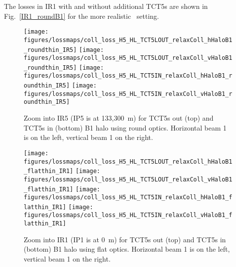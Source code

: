 The losses in IR1 with and without additional TCT5s are shown in Fig.~\ref{IR1_roundB1} for the more realistic \twosigmaret~setting. 

\begin{figure}
\begin{center}
\vskip-12mm
\texttt{[image: figures/lossmaps/coll\_loss\_H5\_HL\_TCT5LOUT\_relaxColl\_hHaloB1\_roundthin\_IR5]}
\texttt{[image: figures/lossmaps/coll\_loss\_H5\_HL\_TCT5LOUT\_relaxColl\_vHaloB1\_roundthin\_IR5]}
\texttt{[image: figures/lossmaps/coll\_loss\_H5\_HL\_TCT5IN\_relaxColl\_hHaloB1\_roundthin\_IR5]}
\texttt{[image: figures/lossmaps/coll\_loss\_H5\_HL\_TCT5IN\_relaxColl\_vHaloB1\_roundthin\_IR5]}
\end{center}
\vspace{-0.3cm}
 \caption{Zoom into IR5 (IP5 is at 133,300~m) for TCT5s out (top) and TCT5s in (bottom) B1 halo using round optics. Horizontal beam 1 is on the left, vertical beam 1 on the right.
  \label{IR5_roundB1}}
\end{figure}

\begin{figure}
\begin{center}
\vskip-12mm
\texttt{[image: figures/lossmaps/coll\_loss\_H5\_HL\_TCT5LOUT\_relaxColl\_hHaloB1\_flatthin\_IR1]}
\texttt{[image: figures/lossmaps/coll\_loss\_H5\_HL\_TCT5LOUT\_relaxColl\_vHaloB1\_flatthin\_IR1]}
\texttt{[image: figures/lossmaps/coll\_loss\_H5\_HL\_TCT5IN\_relaxColl\_hHaloB1\_flatthin\_IR1]}
\texttt{[image: figures/lossmaps/coll\_loss\_H5\_HL\_TCT5IN\_relaxColl\_vHaloB1\_flatthin\_IR1]}
\end{center}
\vspace{-0.3cm}
 \caption{Zoom into IR1 (IP1 is at 0~m) for TCT5s out (top) and TCT5s in (bottom) B1 halo using flat optics. Horizontal beam 1 is on the left, vertical beam 1 on the right.
  \label{IR1_flatB1}}
\end{figure}


